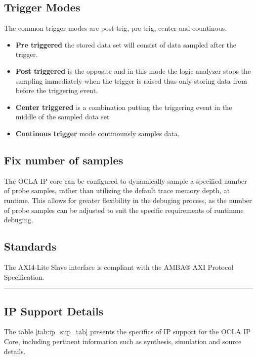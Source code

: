 \subsection*{\fontsize{14}{16}\selectfont Trigger Modes}
The common trigger modes are post trig, pre trig, center and countinous.
\begin{itemize}[noitemsep]
	\item \textbf{Pre triggered} the
	      stored data set will consist of data sampled after the trigger.
	\item \textbf{Post triggered} is the opposite and in
	      this mode the logic analyzer stops the sampling immediately when the trigger is raised
	      thus only storing data from before the triggering event.
	\item \textbf{Center triggered} is a combination putting the
	      triggering event in the middle of the sampled data set
	\item \textbf{Continous trigger} mode continounsly samples data.
\end{itemize}

\subsection*{Fix number of samples}
The OCLA IP core can be configured to dynamically sample a specified number of probe samples, rather than utilizing the default trace memory depth, at runtime. 
This allows for greater flexibility in the debuging process, as the number of probe samples can be adjusted to suit the specific requirements of runtimme debuging.
\subsection*{\fontsize{14}{16}\selectfont Standards}
The AXI4-Lite Slave interface is compliant with the AMBA® AXI Protocol
Specification.
\par\noindent\rule{\textwidth}{0.4pt}
\newpage
  \subsection*{\fontsize{14}{16}\selectfont IP Support Details}
  The table  \ref{tab:ip_sup_tab} presents the specifics of IP support for the OCLA IP Core, including pertinent information such as synthesis, simulation and source details.
\\ \\


